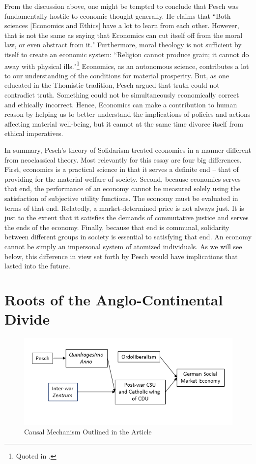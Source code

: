 \documentclass{article}
\begin{document}
From the discussion above, one might be tempted to conclude that Pesch was fundamentally hostile to economic thought generally.  He claims that ``Both sciences [Economics and Ethics] have a lot to learn from each other.  However, that is not the same as saying that Economics can cut itself off from the moral law, or even abstract from it." \citep[chap. 10]{pesch2004}  Furthermore, moral theology is not sufficient by itself to create an economic system:  ``Religion cannot produce grain; it cannot do away with physical ills."\footnote{Quoted in \citet[p. 151]{mueller1951}.}  Economics, as an autonomous science, contributes a lot to our understanding of the conditions for material prosperity.  But, as one educated in the Thomistic tradition, Pesch argued that truth could not contradict truth.  Something could not be simultaneously economically correct and ethically incorrect.  Hence, Economics can make a contribution to human reason by helping us to better understand the implications of policies and actions affecting material well-being, but it cannot at the same time divorce itself from ethical imperatives.\medskip

In summary, Pesch’s theory of Solidarism treated economics in a manner different from neoclassical theory.  Most relevantly for this essay are four big differences.  First, economics is a practical science in that it serves a definite end – that of providing for the material welfare of society.  Second, because economics serves that end, the performance of an economy cannot be measured solely using the satisfaction of subjective utility functions.  The economy must be evaluated in terms of that end.  Relatedly, a market-determined price is not always just.  It is just to the extent that it satisfies the demands of commutative justice and serves the ends of the economy.  Finally, because that end is communal, solidarity between different groups in society is essential to satisfying that end.  An economy cannot be simply an impersonal system of atomized individuals.  As we will see below, this difference in view set forth by Pesch would have implications that lasted into the future.

\section{Roots of the Anglo-Continental Divide}

\begin{figure}
    \centering
    \includegraphics{Figure1.png}
    \caption{Causal Mechanism Outlined in the Article}
    \label{fig:causalmechanism}
\end{figure}
\end{document}

